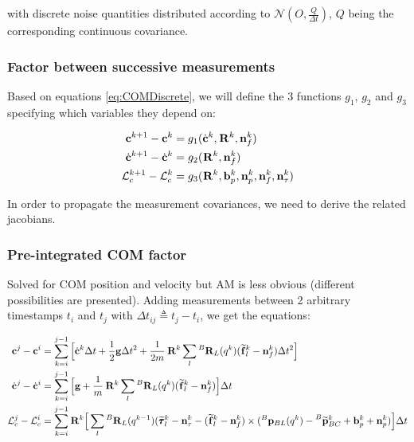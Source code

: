 \documentclass[11pt]{article}
\newcommand{\Rot}[2]{\prescript{#1}{}{\bfR}_{#2}}
\newcommand{\noise}{\bfn}
\newcommand{\posi}[2]{\prescript{#1}{}{\bfp}_{#2}}
\newcommand{\posim}[2]{\prescript{#1}{}{\widetilde{\bfp}}_{#2}}
\newcommand{\forcem}[2]{\prescript{#1}{}{\widetilde{\bff}}_{#2}}
\newcommand{\torquem}[2]{\prescript{#1}{}{\widetilde{\pmb{\tau}}}_{#2}}
\newcommand{\AM}{\mathcal{L}}
\newcommand{\COM}{\bfc}
\begin{document}
with discrete noise quantities distributed according to \( \mathcal{N}(O,\frac{Q}{\Delta t}) \), \(Q\) being the corresponding continuous covariance.


\subsubsection{Factor between successive measurements}
Based on equations \ref{eq:COMDiscrete}, we will define the 3 functions \(g_1\), \(g_2\) and \(g_3\) specifying which variables they depend on:

\begin{equation}
\begin{split}
\COM^{k+1} - \COM^{k} &=  g_1(\dot{\COM}^{k}, \Rot{}{}^{k}, \noise_f^{k})
\\
\dot{\COM}^{k+1} - \dot{\COM}^{k} &= g_2(\Rot{}{}^{k}, \noise_f^{k}) 
\\
\AM_c^{k+1} - \AM_c^{k} &= g_3(\Rot{}{}^{k}, \bfb_{p}^k, \noise_p^k, \noise_f^{k}, \noise_\tau^{k})
\end{split}
\end{equation}

In order to propagate the measurement covariances, we need to derive the related jacobians.

\subsubsection{Pre-integrated COM factor}
Solved for COM position and velocity but AM is less obvious (different possibilities are presented). Adding measurements between 2 arbitrary timestamps \(t_i\) and \(t_j\) with \(\Delta t_{ij} \triangleq t_j - t_i\), we get the equations:

\begin{equation}
\begin{split}
\COM^{j} - \COM^{i} &= \sum_{k=i}^{j-1} \Big[ 
\dot{\COM}^{k} \Delta t 
+ \dfrac{1}{2}\bfg \Delta t^2 + \frac{1}{2m} \Rot{}{}^{k} \sum_l \Rot{B}{L}(q^{k}) (\forcem{}{l}^{k} - \noise_f^{k})\Delta t^2 \Big]
\\
\dot{\COM}^{j} - \dot{\COM}^{i} &= \sum_{k=i}^{j-1} \Big[ 
\bfg + \frac{1}{m} \Rot{}{}^{k} \sum_l \Rot{B}{L}(q^{k}) (\forcem{}{l}^{k} - \noise_f^{k}) \Big] \Delta t 
\\
\AM_c^{j} - \AM_c^{i} &=  \sum_{k=i}^{j-1} \Rot{}{}^{k} \Big[ 
\sum_l \Rot{B}{L}(q^{k-1}) (\torquem{}{l}^{k} - \noise_{\tau}^{k} - (\forcem{}{l}^{k} - \noise_f^{k}) \times (\posi{B}{BL}(q^k) - \posim{B}{BC}^k + \bfb_{p}^k + \noise_p^k) \Big]  \Delta t
\end{split}
\label{eq:COMij}
\end{equation}
\end{document}
